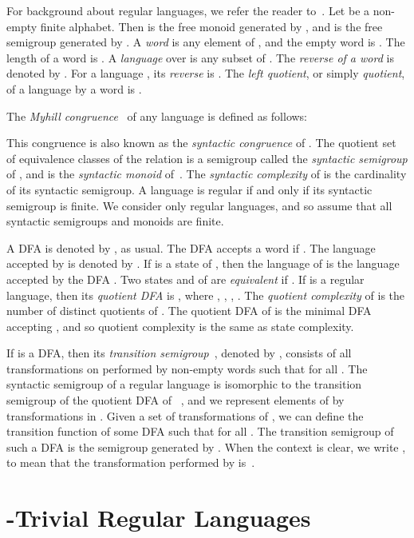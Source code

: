 \documentclass{llncs}
\begin{document}
\medskip

For background about regular languages, we refer the reader to~\cite{Yu97}. Let  be a non-empty finite alphabet. Then  is the free monoid generated by , and  is the free semigroup generated by . A \emph{word} is any element of , and the empty word is . The length of a word  is . A \emph{language} over  is any subset of . The \emph{reverse of a word}  is denoted by . For a language , its \emph{reverse} is . The \emph{left quotient}, or simply \emph{quotient}, of a language  by a word  is   . 

The \emph{Myhill congruence}~\cite{Myh57}  of any language  is defined as follows:

This congruence is also known as the \emph{syntactic congruence} of . The quotient set  of equivalence classes of the relation  is a semigroup called the \emph{syntactic semigroup} of , and  is the \emph{syntactic monoid} of~. 
The \emph{syntactic complexity}  of  is the cardinality of its syntactic semigroup.
A language is regular if and only if its syntactic semigroup is finite. We consider only regular languages, and so assume that all syntactic semigroups and  monoids are finite.

A DFA is denoted by , as usual. The DFA  accepts a word  if . The language accepted by  is denoted by . If  is a state of , then the language  of  is the language accepted by the DFA . Two states  and  of  are \emph{equivalent} if . If  is a regular language, then its \emph{quotient DFA} is , where , , ,  . The \emph{quotient complexity}  of  is the number of distinct quotients of . The quotient DFA of  is the minimal DFA accepting , and so quotient complexity is the same as state complexity. 


If  is a DFA, then its \emph{transition semigroup}~\cite{Pin97}, denoted by , consists of all transformations  on  performed by non-empty words  such that  for all . The syntactic semigroup  of a regular language  is isomorphic to the transition semigroup of the quotient DFA  of ~\cite{McNP71}, and we represent elements of  by transformations in . 
Given a set  of transformations of , we can define the transition function  of some DFA  such that  for all . The transition semigroup of such a DFA is the semigroup generated by . When the context is clear, we write ,  to mean that the transformation performed by  is~.

\section{-Trivial Regular Languages}\label{sec:Rtrivial} 
\end{document}
